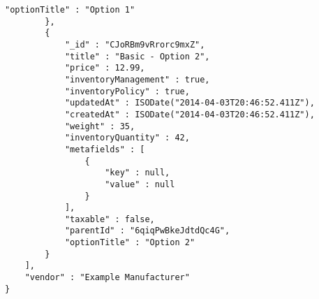 \begin{lstlisting}[caption= Estructura de un \itemcommerce, label=source:javascript:estructura_itemcommerce]
            "optionTitle" : "Option 1"
        }, 
        {
            "_id" : "CJoRBm9vRrorc9mxZ",
            "title" : "Basic - Option 2",
            "price" : 12.99,
            "inventoryManagement" : true,
            "inventoryPolicy" : true,
            "updatedAt" : ISODate("2014-04-03T20:46:52.411Z"),
            "createdAt" : ISODate("2014-04-03T20:46:52.411Z"),
            "weight" : 35,
            "inventoryQuantity" : 42,
            "metafields" : [ 
                {
                    "key" : null,
                    "value" : null
                }
            ],
            "taxable" : false,
            "parentId" : "6qiqPwBkeJdtdQc4G",
            "optionTitle" : "Option 2"
        }
    ],
    "vendor" : "Example Manufacturer"
}
\end{lstlisting}